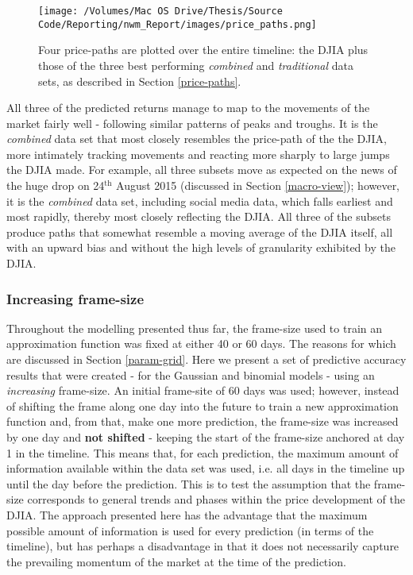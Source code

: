 \documentclass{article}
\begin{document}
\begin{figure}[htb]
\centering
\texttt{[image: /Volumes/Mac OS Drive/Thesis/Source Code/Reporting/nwm\_Report/images/price\_paths.png]}
\caption[Four price-paths, comparing forecasted returns against actual returns]{\label{fig:price-paths}Four price-paths are plotted over the entire timeline: the DJIA plus those of the three best performing \emph{combined} and \emph{traditional} data sets, as described in Section \ref{price-paths}.}
\end{figure}

All three of the predicted returns manage to map to the movements of the market fairly well - following similar patterns of peaks and troughs. It is the \emph{combined} data set that most closely resembles the price-path of the the DJIA, more intimately tracking movements and reacting more sharply to large jumps the DJIA made. For example, all three subsets move as expected on the news of the huge drop on 24$^{\text{th}}$ August 2015 (discussed in Section \ref{macro-view}); however, it is the \emph{combined} data set, including social media data, which falls earliest and most rapidly, thereby most closely reflecting the DJIA. All three of the subsets produce paths that somewhat resemble a moving average of the DJIA itself, all with an upward bias and without the high levels of granularity exhibited by the DJIA.


\subsubsection{Increasing frame-size}
\label{sec-1-4-6}

Throughout the modelling presented thus far, the frame-size used to train an approximation function was fixed at either 40 or 60 days. The reasons for which are discussed in Section \ref{param-grid}. Here we present a set of predictive accuracy results that were created - for the Gaussian and binomial models - using an \emph{increasing} frame-size. An initial frame-site of 60 days was used; however, instead of shifting the frame along one day into the future to train a new approximation function and, from that, make one more prediction, the frame-size was increased by one day and \textbf{not shifted} - keeping the start of the frame-size anchored at day 1 in the timeline. This means that, for each prediction, the maximum amount of information available within the data set was used, i.e. all days in the timeline up until the day before the prediction. This is to test the assumption that the frame-size corresponds to general trends and phases within the price development of the DJIA. The approach presented here has the advantage that the maximum possible amount of information is used for every prediction (in terms of the timeline), but has perhaps a disadvantage in that it does not necessarily capture the prevailing momentum of the market at the time of the prediction.
\end{document}
